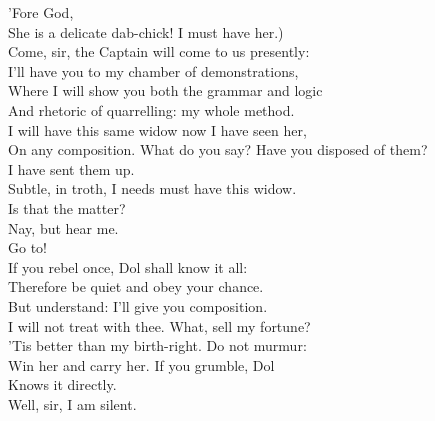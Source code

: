 \documentclass[a4paper,oneside,12pt]{memoir}
\begin{document}
\begin{drama*}
\facespeaks {} 'Fore God,\\
She is a delicate dab-chick! I must have her.)\\
\subtlespeaks {} Come, sir, the Captain will come to us presently:\\
I'll have you to my chamber of demonstrations,\\
Where I will show you both the grammar and logic\\
And rhetoric of quarrelling: my whole method.\\
\facespeaks I will have this same widow now I have seen her,\\
On any composition.
\subtlespeaks {} What do you say?
\facespeaks Have you disposed of them?\\
\subtlespeaks {} I have sent them up.\\
\facespeaks Subtle, in troth, I needs must have this widow.\\
\subtlespeaks Is that the matter?\\
\facespeaks {} Nay, but hear me.\\
\subtlespeaks {} Go to!\\
If you rebel once, Dol shall know it all:\\
Therefore be quiet and obey your chance.\\
\facespeaks But understand: I'll give you composition.\\
\subtlespeaks I will not treat with thee. What, sell my fortune?\\
'Tis better than my birth-right. Do not murmur:\\
Win her and carry her. If you grumble, Dol\\
Knows it directly.\\
\facespeaks {} Well, sir, I am silent.\\

\scene


\end{drama*}
\end{document}
